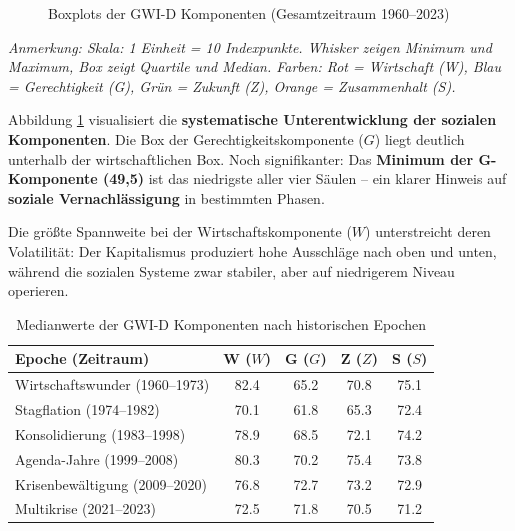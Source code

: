 \begin{figure}[ht]
  \caption{Boxplots der GWI-D Komponenten (Gesamtzeitraum 1960–2023)}
  \label{fig:boxplot_gesamt}
\end{figure}

\begin{flushleft}
\footnotesize{\textit{Anmerkung: Skala: 1 Einheit = 10 Indexpunkte. Whisker zeigen Minimum und Maximum, Box zeigt Quartile und Median. Farben: Rot = Wirtschaft (W), Blau = Gerechtigkeit (G), Grün = Zukunft (Z), Orange = Zusammenhalt (S).}}
\end{flushleft}

Abbildung \ref{fig:boxplot_gesamt} visualisiert die \textbf{systematische Unterentwicklung der sozialen Komponenten}. Die Box der Gerechtigkeitskomponente (\(G\)) liegt deutlich unterhalb der wirtschaftlichen Box. Noch signifikanter: Das \textbf{Minimum der G-Komponente (49,5)} ist das niedrigste aller vier Säulen – ein klarer Hinweis auf \textbf{soziale Vernachlässigung} in bestimmten Phasen.

Die größte Spannweite bei der Wirtschaftskomponente (\(W\)) unterstreicht deren Volatilität: Der Kapitalismus produziert hohe Ausschläge nach oben und unten, während die sozialen Systeme zwar stabiler, aber auf niedrigerem Niveau operieren.

\begin{table}[ht]
  \centering
  \caption{Medianwerte der GWI-D Komponenten nach historischen Epochen}
  \label{tab:epochen_median}
  \begin{tabular}{lcccc}
    \toprule
    \textbf{Epoche (Zeitraum)} & \textbf{W (\(W\))} & \textbf{G (\(G\))} & \textbf{Z (\(Z\))} & \textbf{S (\(S\))} \\
    \midrule
    Wirtschaftswunder (1960–1973)    & 82.4 & 65.2 & 70.8 & 75.1 \\
    Stagflation (1974–1982)          & 70.1 & 61.8 & 65.3 & 72.4 \\
    Konsolidierung (1983–1998)       & 78.9 & 68.5 & 72.1 & 74.2 \\
    Agenda-Jahre (1999–2008)         & 80.3 & 70.2 & 75.4 & 73.8 \\
    Krisenbewältigung (2009–2020)    & 76.8 & 72.7 & 73.2 & 72.9 \\
    Multikrise (2021–2023)           & 72.5 & 71.8 & 70.5 & 71.2 \\
    \bottomrule
  \end{tabular}
\end{table}

